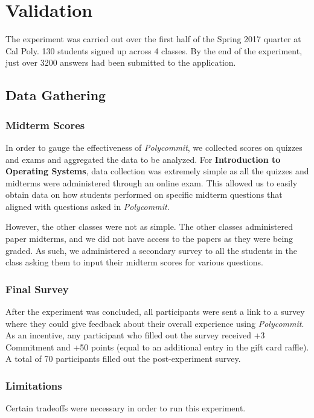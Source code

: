 \chapter{Validation}

\par The experiment was carried out over the first half of the Spring 2017 quarter at Cal Poly. 130 students signed up across 4 classes. By the end of the experiment, just over 3200 answers had been submitted to the application.

\section{Data Gathering}

\subsection{Midterm Scores}
\par In order to gauge the effectiveness of \textit{Polycommit}, we collected scores on quizzes and exams and aggregated the data to be analyzed. For \textbf{Introduction to Operating Systems}, data collection was extremely simple as all the quizzes and midterms were administered through an online exam. This allowed us to easily obtain data on how students performed on specific midterm questions that aligned with questions asked in \textit{Polycommit}.

\par However, the other classes were not as simple. The other classes administered paper midterms, and we did not have access to the papers as they were being graded. As such, we administered a secondary survey to all the students in the class asking them to input their midterm scores for various questions.

\subsection{Final Survey}
\par After the experiment was concluded, all participants were sent a link to a survey where they could give feedback about their overall experience using \textit{Polycommit}. As an incentive, any participant who filled out the survey received +3 Commitment and +50 points (equal to an additional entry in the gift card raffle). A total of 70 participants filled out the post-experiment survey.

\subsection{Limitations}
\par Certain tradeoffs were necessary in order to run this experiment.
